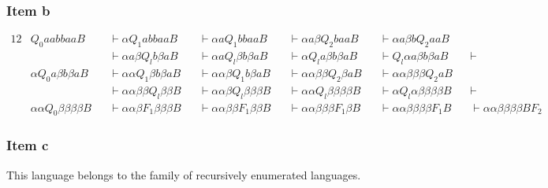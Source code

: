 \documentclass[docid=TP11]{tcom_TP}
\begin{document}
{\begin{center}
\end{center}
\subsubsection{Item b}
\begin{alignat*}{12}
	& Q_0 aabbaaB &&\vdash \alpha  Q_1 abbaa B &&\vdash \alpha a Q_1 bbaa B &&\vdash \alpha a\beta  Q_2 baaB &&\vdash \alpha a\beta b Q_2 aaB \\
	&             &&\vdash \alpha a\beta  Q_l b\beta aB &&\vdash \alpha a Q_l \beta b\beta aB &&\vdash \alpha Q_l a \beta b\beta a B &&\vdash Q_l \alpha a \beta b\beta aB &&\vdash \\
	& \alpha Q_0 a \beta b\beta aB &&\vdash \alpha \alpha Q_1 \beta b\beta aB &&\vdash \alpha \alpha \beta Q_1 b\beta aB &&\vdash \alpha \alpha \beta \beta Q_2 \beta aB &&\vdash \alpha \alpha \beta \beta \beta Q_2 aB \\
	&            &&\vdash \alpha \alpha \beta \beta Q_l \beta \beta B &&\vdash \alpha \alpha \beta Q_l \beta \beta \beta B &&\vdash \alpha \alpha Q_l \beta \beta \beta \beta B &&\vdash \alpha Q_l \alpha \beta \beta \beta \beta B && \vdash \\
	& \alpha \alpha Q_0 \beta \beta \beta \beta B &&\vdash \alpha \alpha \beta F_1 \beta \beta \beta B &&\vdash \alpha \alpha \beta \beta F_1 \beta \beta B &&\vdash \alpha \alpha \beta \beta \beta F_1 \beta B &&\vdash \alpha \alpha \beta \beta \beta \beta F_1 B &&\vdash \alpha \alpha \beta \beta \beta \beta B F_2
\end{alignat*}
\subsubsection{Item c}
This language belongs to the family of recursively enumerated languages.
\pagebreak
}
\end{document}
